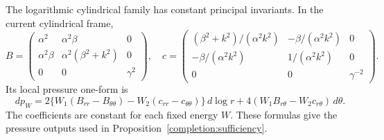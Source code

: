 The logarithmic cylindrical family has constant principal invariants.
In the current cylindrical frame,
\[
 B=\begin{pmatrix}\alpha^2&\alpha^2\beta&0\\
       \alpha^2\beta&\alpha^2(\beta^2+k^2)&0\\0&0&\gamma^2\end{pmatrix},
 \quad
 c=\begin{pmatrix}
 (\beta^2+k^2)/(\alpha^2k^2)&-\beta/(\alpha^2k^2)&0\\
 -\beta/(\alpha^2k^2)&1/(\alpha^2k^2)&0\\0&0&\gamma^{-2}
 \end{pmatrix}.
\]
Its local pressure one-form is
\[
 dp_W=2\{W_1(B_{rr}-B_{\theta\theta})-W_2(c_{rr}-c_{\theta\theta})\}\,d\log r
           +4(W_1B_{r\theta}-W_2c_{r\theta})\,d\theta.
\]
The coefficients are constant for each fixed energy $W$.
These formulas give the pressure outputs used in
Proposition~\ref{completion:sufficiency}.

\restoregeometry
\setcounter{section}{\suppSavedSection}
\setcounter{equation}{\suppSavedEquation}
\setcounter{table}{\suppSavedTable}
\endgroup
